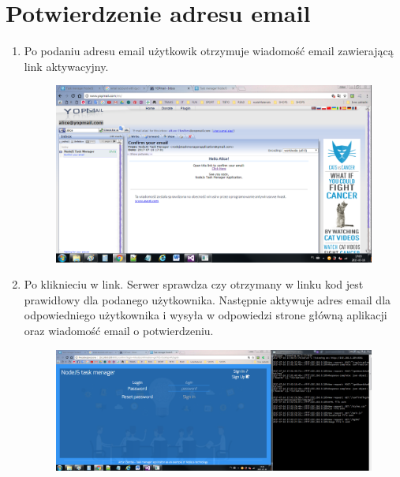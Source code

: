 \documentclass[12pt]{report}
\begin{document}
\section{Potwierdzenie adresu email}
\begin{enumerate}
\item Po podaniu adresu email użytkowik otrzymuje wiadomość email zawierającą link aktywacyjny.
\begin{figure}[h]
\centering
\includegraphics[width=\textwidth,height=\textheight,keepaspectratio]{31.png}
\end{figure}
\item Po kliknieciu w link. Serwer sprawdza czy otrzymany w linku kod jest prawidłowy dla podanego użytkownika. 
Następnie aktywuje adres email dla odpowiedniego użytkownika i wysyła w odpowiedzi strone główną aplikacji oraz wiadomość email o potwierdzeniu.
\begin{figure}[h]
\centering
\includegraphics[width=\textwidth,height=\textheight,keepaspectratio]{32.png}
\end{figure}
\end{enumerate}
\end{document}
